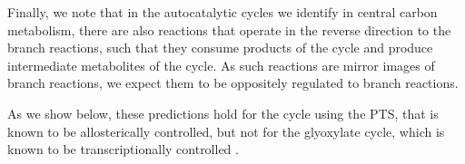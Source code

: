     Finally, we note that in the autocatalytic cycles we identify in central carbon metabolism, there are also reactions that operate in the reverse direction to the branch reactions, such that they consume products of the cycle and produce intermediate metabolites of the cycle.
    As such reactions are mirror images of branch reactions, we expect them to be oppositely regulated to branch reactions.

    As we show below, these predictions hold for the cycle using the PTS, that is known to be allosterically controlled, but not for the glyoxylate cycle, which is known to be transcriptionally controlled \cite{Gerosa2015-oq}.

\renewcommand\thesubsection{}
